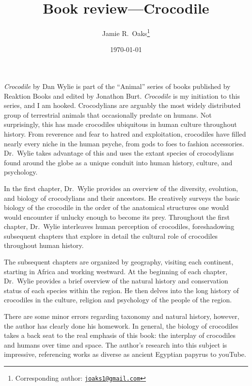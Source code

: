 \documentclass[letterpaper,12pt]{article}
\title{Book review---Crocodile}
\author[1]{Jamie R.\ Oaks\thanks{Corresponding author: \href{mailto:joaks1@gmail.com}{\tt joaks1@gmail.com}}}
\affil[1]{Department of Biology, University of Washington, Seattle, Washington 98195}
\date{\today}
\newcommand{\croc}{\emph{Crocodile}\xspace}
\begin{document}
\maketitle

\newpage
\doublespacing

\croc by Dan Wylie \citep{Wylie2013} is part of the ``Animal'' series of books
published by Reaktion Books and edited by Jonathon Burt.
\croc is my initiation to this series, and I am hooked.
Crocodylians are arguably the most widely distributed group of terrestrial
animals that occasionally predate on humans.
Not surprisingly, this has made crocodiles ubiquitous in human culture
throughout history.
From reverence and fear to hatred and exploitation, crocodiles have filled
nearly every niche in the human psyche, from gods to foes to fashion
accessories.
Dr.\ Wylie takes advantage of this and uses the extant species of crocodylians
found around the globe as a unique conduit into human history, culture, and
psychology.

In the first chapter, Dr.\ Wylie provides an overview of the diversity,
evolution, and biology of crocodylians and their ancestors.
He creatively surveys the basic biology of the crocodile in the order of the
anatomical structures one would would encounter if unlucky enough to
become its prey.
Throughout the first chapter, Dr.\ Wylie interleaves human perception of
crocodiles, foreshadowing subsequent chapters that explore in detail the
cultural role of crocodiles throughout human history.

The subsequent chapters are organized by geography, visiting each continent,
starting in Africa and working westward.
At the beginning of each chapter, Dr.\ Wylie provides a brief overview of the
natural history and conservation status of each species within the region.
He then delves into the long history of crocodiles in the culture, religion and
psychology of the people of the region.

There are some minor errors regarding taxonomy and natural history, however,
the author has clearly done his homework.
In general, the biology of crocodiles takes a back seat to the real emphasis of
this book: the interplay of crocodiles and humans over time and space.
The author's research into this subject is impressive, referencing works as
diverse as ancient Egyptian papyrus to youTube.




\end{document}
